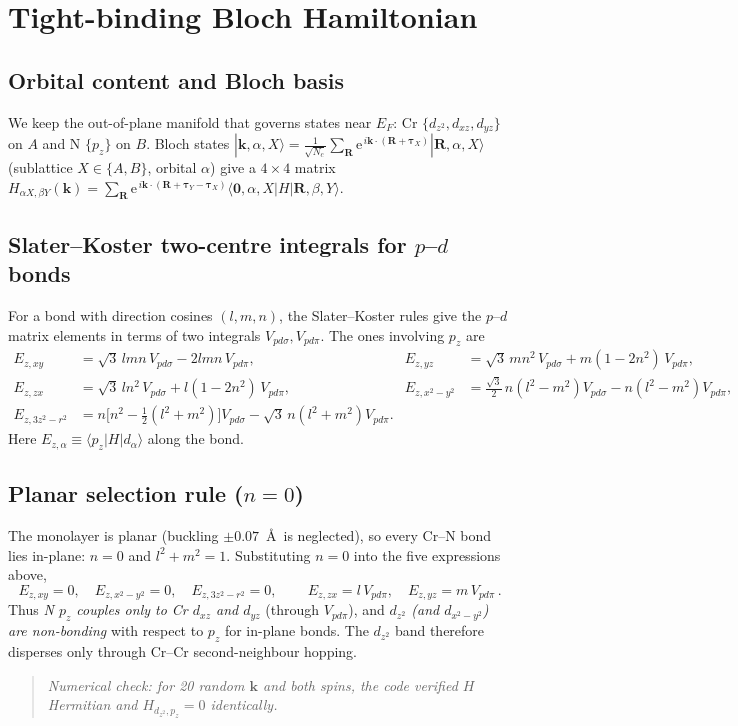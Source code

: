 \documentclass[11pt]{article}
\newcommand{\ee}{\mathrm{e}}
\begin{document}
\section{Tight-binding Bloch Hamiltonian}

\subsection{Orbital content and Bloch basis}
We keep the out-of-plane manifold that governs states near $E_F$: Cr $\{d_{z^2},d_{xz},d_{yz}\}$
on $A$ and N $\{p_z\}$ on $B$. Bloch states $|\mathbf k,\alpha,X\rangle
=\frac{1}{\sqrt{N_c}}\sum_{\mathbf R}\ee^{\,i\mathbf k\cdot(\mathbf R+\boldsymbol\tau_X)}
|\mathbf R,\alpha,X\rangle$ (sublattice $X\in\{A,B\}$, orbital $\alpha$) give a $4\times4$
matrix $H_{\alpha X,\beta Y}(\mathbf k)=\sum_{\mathbf R}\ee^{\,i\mathbf k\cdot(\mathbf R+\boldsymbol\tau_Y-\boldsymbol\tau_X)}
\langle \mathbf 0,\alpha,X|H|\mathbf R,\beta,Y\rangle$.

\subsection{Slater--Koster two-centre integrals for $p$--$d$ bonds}
For a bond with direction cosines $(l,m,n)$, the Slater--Koster rules give the $p$--$d$ matrix
elements in terms of two integrals $V_{pd\sigma},V_{pd\pi}$. The ones involving $p_z$ are
\begin{align}
E_{z,xy}&=\sqrt3\,l m n\,V_{pd\sigma}-2 l m n\,V_{pd\pi}, &
E_{z,yz}&=\sqrt3\,m n^2\,V_{pd\sigma}+m(1-2n^2)\,V_{pd\pi},\\
E_{z,zx}&=\sqrt3\,l n^2\,V_{pd\sigma}+l(1-2n^2)\,V_{pd\pi}, &
E_{z,x^2-y^2}&=\tfrac{\sqrt3}{2}\,n(l^2-m^2)V_{pd\sigma}-n(l^2-m^2)V_{pd\pi},\\
E_{z,3z^2-r^2}&=n\big[n^2-\tfrac12(l^2+m^2)\big]V_{pd\sigma}-\sqrt3\,n(l^2+m^2)V_{pd\pi}. &&
\end{align}
Here $E_{z,\alpha}\equiv\langle p_z|H|d_\alpha\rangle$ along the bond.

\subsection{Planar selection rule ($n=0$)}
The monolayer is planar (buckling $\pm0.07$~\AA\ is neglected), so every Cr--N bond lies in-plane:
$n=0$ and $l^2+m^2=1$. Substituting $n=0$ into the five expressions above,
\begin{equation}
E_{z,xy}=0,\quad E_{z,x^2-y^2}=0,\quad E_{z,3z^2-r^2}=0,\qquad
\boxed{\,E_{z,zx}=l\,V_{pd\pi},\quad E_{z,yz}=m\,V_{pd\pi}\,.}
\end{equation}
Thus \emph{N $p_z$ couples only to Cr $d_{xz}$ and $d_{yz}$} (through $V_{pd\pi}$), and
\emph{$d_{z^2}$ (and $d_{x^2-y^2}$) are non-bonding} with respect to $p_z$ for in-plane bonds. The
$d_{z^2}$ band therefore disperses only through Cr--Cr second-neighbour hopping.
\begin{quote}\small\itshape
Numerical check: for 20 random $\mathbf k$ and both spins, the code verified $H$ Hermitian and
$H_{d_{z^2},p_z}=0$ identically.
\end{quote}
\end{document}
